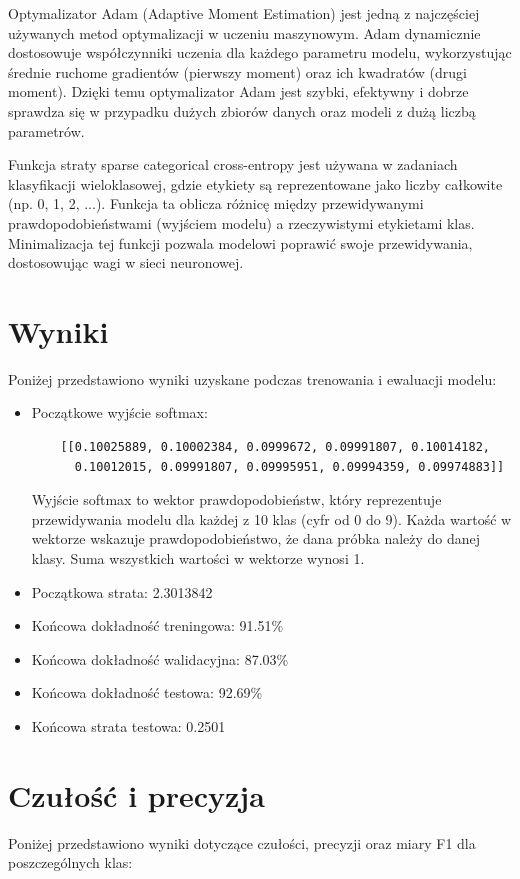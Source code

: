 \documentclass{article}
\begin{document}
Optymalizator Adam (Adaptive Moment Estimation) jest jedną z najczęściej używanych metod optymalizacji w uczeniu maszynowym. Adam dynamicznie dostosowuje współczynniki uczenia dla każdego parametru modelu, wykorzystując średnie ruchome gradientów (pierwszy moment) oraz ich kwadratów (drugi moment). Dzięki temu optymalizator Adam jest szybki, efektywny i dobrze sprawdza się w przypadku dużych zbiorów danych oraz modeli z dużą liczbą parametrów.

Funkcja straty sparse categorical cross-entropy jest używana w zadaniach klasyfikacji wieloklasowej, gdzie etykiety są reprezentowane jako liczby całkowite (np. 0, 1, 2, ...). Funkcja ta oblicza różnicę między przewidywanymi prawdopodobieństwami (wyjściem modelu) a rzeczywistymi etykietami klas. Minimalizacja tej funkcji pozwala modelowi poprawić swoje przewidywania, dostosowując wagi w sieci neuronowej.
\section{Wyniki} \label{sec:results}
Poniżej przedstawiono wyniki uzyskane podczas trenowania i ewaluacji modelu:

\begin{itemize}
    \item Początkowe wyjście softmax:
    \begin{verbatim}
    [[0.10025889, 0.10002384, 0.0999672, 0.09991807, 0.10014182, 
      0.10012015, 0.09991807, 0.09995951, 0.09994359, 0.09974883]]
    \end{verbatim}
    Wyjście softmax to wektor prawdopodobieństw, który reprezentuje przewidywania modelu dla każdej z 10 klas (cyfr od 0 do 9). Każda wartość w wektorze wskazuje prawdopodobieństwo, że dana próbka należy do danej klasy. Suma wszystkich wartości w wektorze wynosi 1.
    \item Początkowa strata: 2.3013842
    \item Końcowa dokładność treningowa: 91.51\%
    \item Końcowa dokładność walidacyjna: 87.03\%
    \item Końcowa dokładność testowa: 92.69\%
    \item Końcowa strata testowa: 0.2501
\end{itemize}
\section{Czułość i precyzja} \label{sec:precision_recall}
Poniżej przedstawiono wyniki dotyczące czułości, precyzji oraz miary F1 dla poszczególnych klas:
\end{document}
